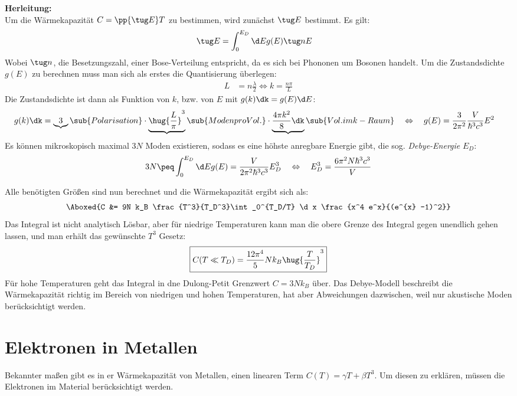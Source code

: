 \documentclass[bfvec]{summery_5.0}
\begin{document}
{\bf Herleitung:}\\
Um die Wärmekapazität $C = \pp {\tug E}T$ zu bestimmen, wird zunächst $\tug E $ 
bestimmt. Es gilt:
\begin{align*}
    \tug E &= \int_0^{E_D}\d E g(E)\tug n E 
\end{align*}
Wobei $\tug n$, die Besetzungszahl, einer Bose-Verteilung entspricht, da es sich bei Phononen um Bosonen handelt. 
Um die Zustandsdichte $g(E)$ zu berechnen muss man sich als erstes die Quantisierung überlegen:
\begin{align*}
    L &= n \frac{\lambda}{2} \Leftrightarrow k = \frac{n\pi}{L}
\end{align*}
Die Zustandsdichte ist dann als Funktion von $k$, bzw. von $E$ mit $g(k)\dk = g(E)\d E$: 
\begin{align*}
    g(k)\dk  &= \underbrace{3}\sub{Polarisation}\cdot \underbrace{\hug{\frac{L}{\pi}}^3}\sub{Moden pro Vol.} \cdot \underbrace{\frac{4\pi k^2}{8}\dk}\sub{Vol. im k-Raum}\quad  \Leftrightarrow\quad  g(E) = \frac{3}{2\pi^2}\frac{V}{\hbar^3 c^3} E^2
\end{align*}
Es können mikroskopisch maximal $3N$ Moden existieren, sodass es eine höhste anregbare Energie gibt, die sog. \emph{Debye-Energie} $E_D$:
\begin{align*}
    3N \peq \int_0^{E_D} \d E g(E) = \frac{V}{2\pi^2 \hbar^3 c^3} E_D^3 \quad\Leftrightarrow\quad E_D^3 = \frac{6\pi^2 N \hbar^3 c^3}{V}
\end{align*}

Alle benötigten Größen sind nun berechnet und die Wärmekapazität ergibt sich als:
\begin{align*}
    \Aboxed{C &= 9N k_B \frac{T^3}{T_D^3}\int_0^{T_D/T} \d x \frac{x^4 e^x}{(e^{x} -1)^2}}
\end{align*}
Das Integral ist nicht analytisch Lösbar, aber für niedrige Temperaturen kann man die obere Grenze des Integral gegen unendlich gehen lassen, und man erhält das gewünschte \(T^3\) Gesetz:
\begin{align*}
    \boxed{C(T\ll T_D)= \frac{12\pi^4}{5} N k_B \hug{\frac T{T_D}}^3}
\end{align*}
Für hohe Temperaturen geht das Integral in dne Dulong-Petit Grenzwert $C=3N k_B$ über. Das Debye-Modell beschreibt die Wärmekapazität richtig im Bereich von niedrigen und hohen Temperaturen, hat aber Abweichungen dazwischen, weil nur akustische Moden berücksichtigt werden. 


\section{Elektronen in Metallen}
Bekannter maßen gibt es in er Wärmekapazität von Metallen, einen linearen Term $C(T) = \gamma T + \beta T^3$. Um diesen zu erklären, müssen die Elektronen im Material berücksichtigt werden. 
\end{document}
